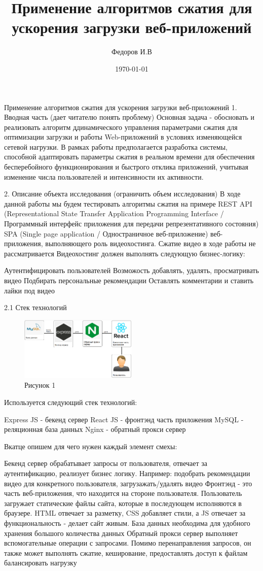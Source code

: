 \documentclass[12pt]{article}
\title{Применение алгоритмов сжатия для ускорения загрузки веб-приложений}
\author{Федоров И.В }
\date{\today}
\begin{document}
\maketitle

Применение алгоритмов сжатия для ускорения загрузки веб-приложений
1. Вводная часть (дает читателю понять проблему)
Основная задача - обосновать и реализовать алгоритм ддинамического управления параметрами сжатия для оптимизации загрузки
и работы Web-приложений в условиях изменяющейся сетевой нагрузки. В рамках работы предполагается разработка системы, способной
адаптировать параметры сжатия в реальном времени для обеспечения бесперебойного функционирования
и быстрого отклика приложений, учитывая изменение числа пользователей и интенсивности их активности.

2. Описание объекта исследования (ограничить объем исследования)
В ходе данной работы мы будем тестировать алгоритмы сжатия на примере REST API (Representational State Transfer Application Programming Interface / Программный интерфейс приложения для передачи репрезентативного состояния) SPA (Single page application / Одностраничное веб-приложение) веб-приложения, выполняющего роль видеохостинга. Сжатие видео в ходе работы не рассматривается
Видеохостинг должен выполнять следующую бизнес-логику:

Аутентифицировать пользователей
Возможость добавлять, удалять, просматривать видео
Подбирать персональные рекомендации
Оставлять комментарии и ставить лайки под видео

2.1 Стек технологий
\begin{figure}[h!]
    \centering
    \includegraphics[width=0.5\textwidth]{../images/Схема_веб-приложения.png}
    \caption{Рисунок 1}
\end{figure}

Используется следующий стек технологий:

Express JS - бекенд сервер
React JS - фронтэнд часть приложения
MySQL - реляционная база данных
Nginx - обратный прокси сервер

Вкатце опишем для чего нужен каждый элемент смехы:

Бекенд сервер обрабатывает запросы от пользователя, отвечает за аутентификацию, реализует бизнес логику. Например: подобрать рекомендации видео для конкретного пользователя, загрузажать/удалять видео
Фронтэнд - это часть веб-приложения, что находится на стороне пользователя. Пользователь загружает статические файлы сайта,
которые в последующем исполняются в браузере. HTML отвечает за разметку, CSS добавляет стили, а JS отвечает за функциональность - делает сайт живым.
База данных необходима для удобного хранения большого количества данных
Обратный прокси сервер выполняет вспомогательные операции с запросами. Помимо перенаправления запросов, он также может выполнять сжатие, кеширование, предоставлять доступ к файлам
балансировать нагрузку
\end{document}
